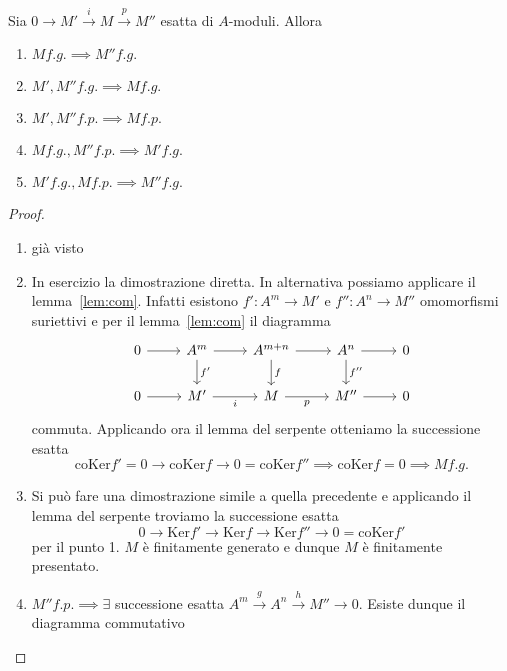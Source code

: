 \begin{proposition}{}
    Sia \(0 \to M' \overset{i}{\to } M \overset{p}{\to } M''\) esatta di
    \(A\)-moduli. Allora
\begin{enumerate}[label = \arabic*.]
    \item \(M f.g. \implies M'' f.g.\) 
    \item \(M', M'' f.g. \implies M f.g.\) 
    \item \(M', M'' f.p. \implies M f.p.\) 
    \item \(M f.g., M'' f.p. \implies M' f.g.\) 
    \item \(M' f.g., M f.p. \implies M'' f.g.\) 
\end{enumerate}
\end{proposition}\label{prop:varie}
\begin{proof}{} \( \) 
\begin{enumerate}[label = \arabic*.]
    \item già visto
    \item In esercizio la dimostrazione diretta. In alternativa possiamo
        applicare il lemma~\ref{lem:com}. Infatti esistono \(f': A^{m} \to M'\) e \(f'' : A^{n} \to M''\) omomorfismi suriettivi e per il lemma~\ref{lem:com} il diagramma
\[\begin{tikzcd}
	0 & A^{m} & A^{m+n} & A^{n} & 0 \\
	0 & M' & M & M'' & 0
	\arrow[from=1-1, to=1-2]
	\arrow[from=1-2, to=1-3]
	\arrow["{f'}", from=1-2, to=2-2]
	\arrow[from=1-3, to=1-4]
	\arrow["f", from=1-3, to=2-3]
	\arrow[from=1-4, to=1-5]
	\arrow["{f''}", from=1-4, to=2-4]
	\arrow[from=2-1, to=2-2]
	\arrow["i"', from=2-2, to=2-3]
	\arrow["p"', from=2-3, to=2-4]
	\arrow[from=2-4, to=2-5]
\end{tikzcd}\]
    commuta. Applicando ora il lemma del serpente otteniamo la successione
    esatta 
    \[
      \mathrm{coKer}f' = 0 \to \mathrm{coKer}f \to  0= \mathrm{coKer} f'' \implies \mathrm{coKer} f = 0 \implies M f.g.
    \]
    \item Si può fare una dimostrazione simile a quella precedente e applicando
        il lemma del serpente troviamo la successione esatta
    \[
    0 \to \mathrm{Ker} f' \to \mathrm{Ker} f \to \mathrm{Ker}f'' \to 0 = \mathrm{coKer} f'
    \]
    per il punto 1. \(M\) è finitamente generato e dunque \(M\) è finitamente
    presentato.
    \item \(M'' f.p. \implies \exists \) successione esatta \(A^{m} \overset{g}{\to } A^{n} \overset{h}{\to }M'' \to 0\). Esiste dunque il diagramma commutativo

\end{enumerate}
\end{proof}
